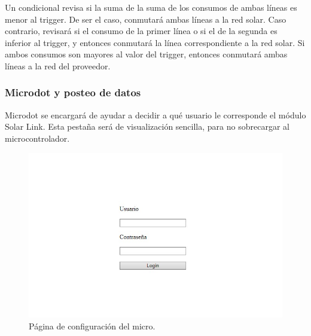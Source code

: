 Un condicional revisa si la suma de la suma de los consumos de ambas líneas es menor al trigger. De ser el caso, conmutará ambas líneas a la red solar. Caso contrario, revisará si el consumo de la primer línea o si el de la segunda es inferior al trigger, y entonces conmutará la línea correspondiente a la red solar. Si ambos consumos son mayores al valor del trigger, entonces conmutará ambas líneas a la red del proveedor.

\subsubsection{Microdot y posteo de datos}

Microdot se encargará de ayudar a decidir a qué usuario le corresponde el módulo Solar Link. Esta pestaña será de visualización sencilla, para no sobrecargar al microcontrolador.

\begin{figure}[H]
    \centering
    \includegraphics[width=1\linewidth]{WhatsApp Image 2023-10-16 at 21.25.50.jpeg}
    \caption{Página de configuración del micro.}
    \label{fig:enter-label}
\end{figure}

